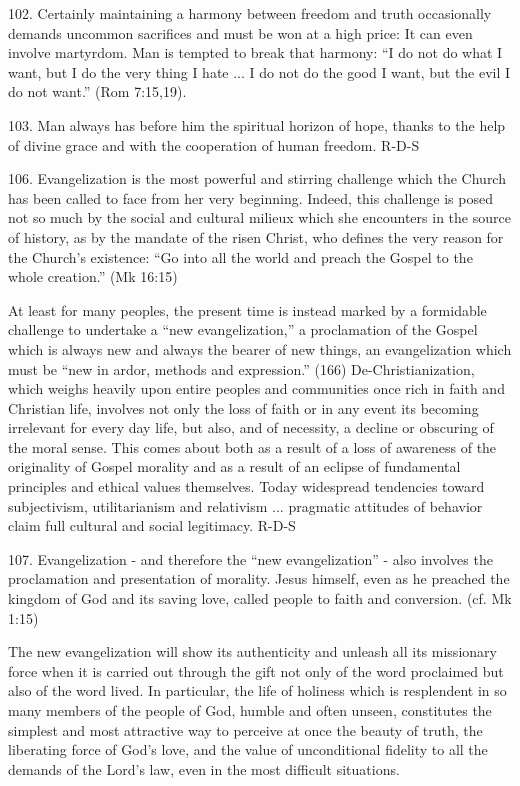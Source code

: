 \documentclass[oneside]{book}
\begin{document}
102. Certainly maintaining a harmony between freedom and truth occasionally
demands uncommon sacrifices and must be won at a high price: It can even involve
martyrdom. Man is tempted to break that harmony: ``I do not do what I want, but
I do the very thing I hate ... I do not do the good I want, but the evil I do
not want.'' (Rom 7:15,19).

103. Man always has before him the spiritual horizon of hope, thanks to the help
of divine grace and with the cooperation of human freedom.
R-D-S

106. Evangelization is the most powerful and stirring challenge which the Church
has been called to face from her very beginning. Indeed, this challenge is posed
not so much by the social and cultural milieux which she encounters in the
source of history, as by the mandate of the risen Christ, who defines the very
reason for the Church's existence: ``Go into all the world and preach the Gospel
to the whole creation.'' (Mk 16:15)

At least for many peoples, the present time is instead marked by a formidable
challenge to undertake a ``new evangelization,'' a proclamation of the Gospel
which is always new and always the bearer of new things, an evangelization which
must be ``new in ardor, methods and expression.'' (166) De-Christianization,
which weighs heavily upon entire peoples and communities once rich in faith and
Christian life, involves not only the loss of faith or in any event its becoming
irrelevant for every day life, but also, and of necessity, a decline or
obscuring of the moral sense. This comes about both as a result of a loss of
awareness of the originality of Gospel morality and as a result of an eclipse of
fundamental principles and ethical values themselves. Today widespread
tendencies toward subjectivism, utilitarianism and relativism ... pragmatic
attitudes of behavior claim full cultural and social legitimacy.
R-D-S

107. Evangelization - and therefore the ``new evangelization'' - also involves
the proclamation and presentation of morality. Jesus himself, even as he
preached the kingdom of God and its saving love, called people to faith and
conversion. (cf. Mk 1:15)

The new evangelization will show its authenticity and unleash all its missionary
force when it is carried out through the gift not only of the word proclaimed
but also of the word lived. In particular, the life of holiness which is
resplendent in so many members of the people of God, humble and often unseen,
constitutes the simplest and most attractive way to perceive at once the beauty
of truth, the liberating force of God's love, and the value of unconditional
fidelity to all the demands of the Lord's law, even in the most difficult situations.
\end{document}
